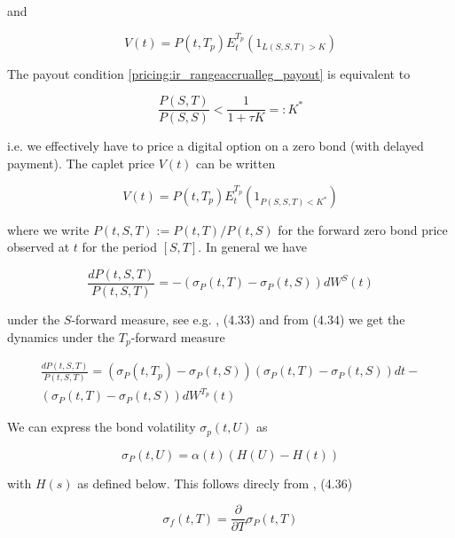 and

\begin{equation}
V(t) = P(t,T_p) E^{T_p}_t( 1_{L(S,S,T) > K} )
\end{equation}

The payout condition \ref{pricing:ir_rangeaccrualleg_payout} is equivalent to

\begin{equation}
\frac{P(S,T)}{P(S,S)} < \frac{1}{1+\tau K} =: K^*
\end{equation}

i.e. we effectively have to price a digital option on a zero bond (with delayed payment). The caplet price $V(t)$ can be
written

\begin{equation}
V(t) = P(t,T_p) E^{T_p}_t( 1_{P(S,S,T) < K^*} )
\end{equation}

where we write $P(t,S,T) := P(t,T) / P(t,S)$ for the forward zero bond price observed at $t$ for the period
$[S,T]$. In general we have

\begin{equation}
\frac{dP(t,S,T)}{P(t,S,T)} = -( \sigma_P(t,T) - \sigma_P(t,S) ) dW^S(t)
\end{equation}

under the $S$-forward measure, see e.g. \cite{Andersen_Piterbarg_2010}, (4.33) and from (4.34) we get the dynamics
under the $T_p$-forward measure

\begin{equation}\label{pricing:ir_rangeaccrualleg_dynamics}
\begin{split}
\frac{dP(t,S,T)}{P(t,S,T)} = ( \sigma_P(t,T_p) - \sigma_P(t,S) )( \sigma_P(t,T) - \sigma_P(t,S) ) dt -\\ ( \sigma_P(t,T) - \sigma_P(t,S) ) dW^{T_p}(t)
\end{split}
\end{equation}

We can express the bond volatility $\sigma_p(t,U)$ as

\begin{equation}\label{pricing:ir_rangeaccrualleg_bondvol}
\sigma_P(t,U) = \alpha(t) \left( H(U) - H(t) \right)
\end{equation}

with $H(s)$ as defined below. This follows direcly from \cite{Andersen_Piterbarg_2010}, (4.36)

\begin{equation}
\sigma_f(t,T) = \frac{\partial}{\partial T} \sigma_P(t,T)
\end{equation}

